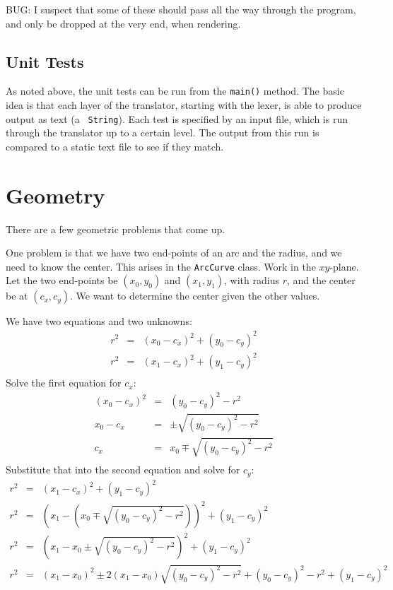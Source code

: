 \documentclass[titlepage,oneside,10pt]{article}
\begin{document}
BUG: I suspect that some of these should pass all the way through the
program, and only be dropped at the very end, when rendering.

\subsection{Unit Tests}

As noted above, the unit tests can be run from the {\tt main()}
method. The basic idea is that each layer of the translator, starting
with the lexer, is able to produce output as text (a {\tt
  String}). Each test is specified by an input file, which is run
through the translator up to a certain level. The output from this run
is compared to a static text file to see if they match.

\section{Geometry}

There are a few geometric problems that come up. 

One problem is that we have two end-points of an arc and the radius,
and we need to know the center. This arises in the {\tt ArcCurve}
class. Work in the $xy$-plane. Let the two
end-points be $(x_0,y_0)$ and $(x_1,y_1)$, with radius $r$, and the
center be at $(c_x,c_y)$. We want to determine the center given the
other values.

We have two equations and two unknowns:
\begin{eqnarray*}
  r^2 &=& (x_0-c_x)^2 + (y_0-c_y)^2 \\
  r^2 &=& (x_1-c_x)^2 + (y_1-c_y)^2 \\
\end{eqnarray*}
Solve the first equation for $c_x$:
\begin{eqnarray*}
  (x_0-c_x)^2 &=& (y_0-c_y)^2 - r^2\\
  x_0-c_x &=& \pm\sqrt{(y_0-c_y)^2 - r^2}\\
  c_x &=& x_0 \mp\sqrt{(y_0-c_y)^2 - r^2}\\
\end{eqnarray*}
Substitute that into the second equation and solve for $c_y$:
\begin{eqnarray*}
  r^2 &=& (x_1-c_x)^2 + (y_1-c_y)^2 \\
  r^2 &=& \left(x_1-\left(x_0 \mp\sqrt{(y_0-c_y)^2 - r^2}\right)\right)^2 + (y_1-c_y)^2 \\
  r^2 &=& \left(x_1-x_0 \pm\sqrt{(y_0-c_y)^2 - r^2}\right)^2 + (y_1-c_y)^2 \\
  r^2 &=& (x_1-x_0)^2 \pm 2(x_1-x_0)\sqrt{(y_0-c_y)^2 - r^2} +
  (y_0-c_y)^2 - r^2 + (y_1-c_y)^2 \\
\end{eqnarray*}
\end{document}
